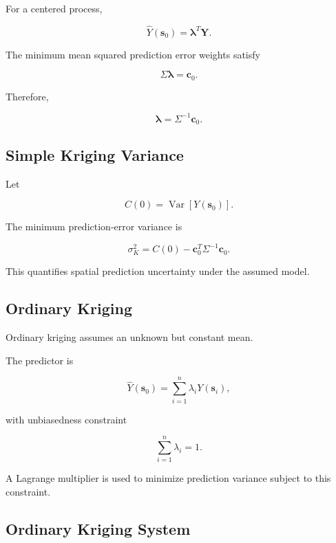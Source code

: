 For a centered process,

\[
\widehat{Y}
(
\mathbf{s}_0
)
=
\boldsymbol{\lambda}^T
\mathbf{Y}.
\]

The minimum mean squared prediction error weights satisfy

\[
\boxed{
\Sigma
\boldsymbol{\lambda}
=
\mathbf{c}_0.
}
\]

Therefore,

\[
\boxed{
\boldsymbol{\lambda}
=
\Sigma^{-1}
\mathbf{c}_0.
}
\]

\subsection{Simple Kriging Variance}
\label{subsec:simple-kriging-variance}

Let

\[
C(0)
=
\operatorname{Var}
[
Y(\mathbf{s}_0)
].
\]

The minimum prediction-error variance is

\[
\boxed{
\sigma_K^2
=
C(0)
-
\mathbf{c}_0^T
\Sigma^{-1}
\mathbf{c}_0.
}
\]

This quantifies spatial prediction uncertainty under the assumed model.

\subsection{Ordinary Kriging}
\label{subsec:ordinary-kriging}

Ordinary kriging assumes an unknown but constant mean.

The predictor is

\[
\boxed{
\widehat{Y}
(
\mathbf{s}_0
)
=
\sum_{i=1}^{n}
\lambda_i
Y
(
\mathbf{s}_i
),
}
\]

with unbiasedness constraint

\[
\boxed{
\sum_{i=1}^{n}\lambda_i=1.
}
\]

A Lagrange multiplier is used to minimize prediction variance subject to
this constraint.

\subsection{Ordinary Kriging System}
\label{subsec:ordinary-kriging-system}

